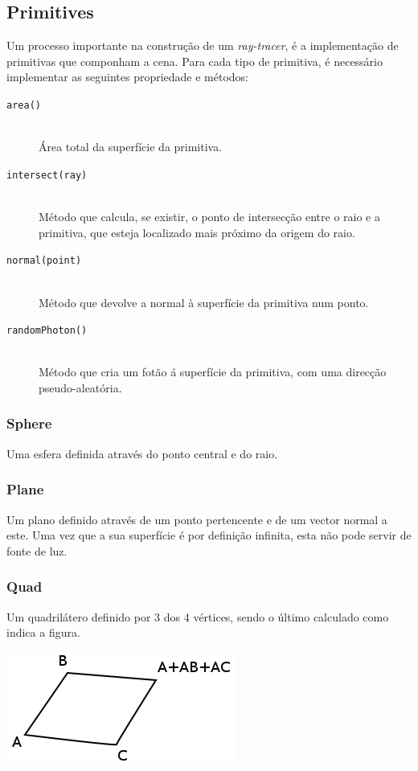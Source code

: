 \documentclass[a4paper]{article}
\begin{document}

\cleardoublepage
\subsection{Primitives}
\indent \indent Um processo importante na construção de um \emph{ray-tracer}, é a implementação de primitivas que componham a cena.
Para cada tipo de primitiva, é necessário implementar as seguintes propriedade e métodos:

\begin{description}
	\item [\texttt{area()}] \hfill \\
		Área total da superfície da primitiva.

	\item [\texttt{intersect(ray)}] \hfill \\
		Método que calcula, se existir, o ponto de intersecção entre o raio e a primitiva, que esteja localizado
		mais próximo da origem do raio.

	\item [\texttt{normal(point)}] \hfill \\
		Método que devolve a normal à superfície da primitiva num ponto.

	\item [\texttt{randomPhoton()}] \hfill \\
		Método que cria um fotão á superfície da primitiva, com uma direcção pseudo-aleatória.
 
\end{description}

\subsubsection{Sphere}
\indent \indent Uma esfera definida através do ponto central e do raio.   

\subsubsection{Plane}
\indent \indent Um plano definido através de um ponto pertencente e de um vector normal a este.
Uma vez que a sua superfície é por definição infinita, esta não pode servir de fonte de luz.

\subsubsection{Quad}
\indent \indent Um quadrilátero definido por 3 dos 4 vértices, sendo o último calculado como indica a figura.
\begin{center}
	\includegraphics[scale=0.50]{images/quad.png}
	\label{fig:quad}
\end{center}
\end{document}
